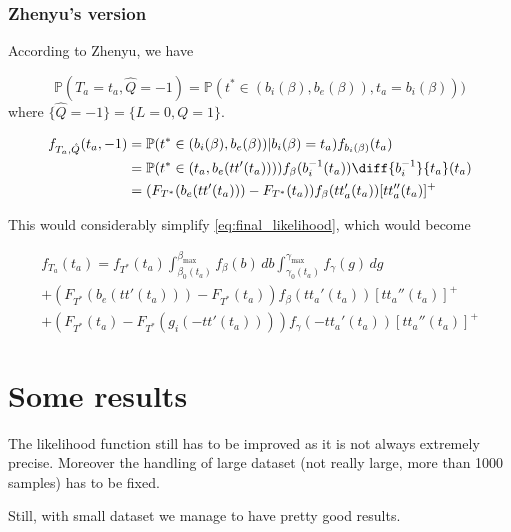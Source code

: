 \documentclass{article}
\begin{document}
\subsubsection{Zhenyu's version}

According to Zhenyu, we have

\begin{equation*}
  \mathbb{P}(T_a = t_a, \hat{Q} = -1) = \mathbb{P}(t^* \in (b_i(\beta), b_e(\beta)), t_a = b_i(\beta)))
\end{equation*}
where \(\{\hat{Q} = -1\} = \{L = 0, Q = 1\}\).

\begin{align*}
  f_{T_a, \hat{Q}}(t_a, -1) & = \mathbb{P}(t^* \in (b_i(\beta), b_e(\beta)) | b_i(\beta) = t_a)f_{b_i(\beta)}(t_a) \\
  & = \mathbb{P}(t^* \in (t_a, b_e(tt'(t_a)))) f_\beta(b_i^{-1}(t_a)) \diff{b_i^{-1}}{t_a}(t_a) \\
  & = (F_{T^*}(b_e(tt'(t_a))) - F_{T^*}(t_a))f_\beta(tt_a'(t_a))[tt_a''(t_a)]^+
\end{align*}

This would considerably simplify \eqref{eq:final_likelihood}, which would become

\begin{multline}
  \label{eq:final_zhenyu}
  f_{T_a}(t_a) = f_{T^*}(t_a)\int_{\beta_0(t_a)}^{\beta_\text{max}}f_\beta(b)\, db\int_{\gamma_0(t_a)}^{\gamma_\text{max}}f_\gamma(g)\, dg \\
  + (F_{T^*}(b_e(tt'(t_a))) - F_{T^*}(t_a))f_\beta(tt_a'(t_a))[tt_a''(t_a)]^+ \\
  + (F_{T^*}(t_a) - F_{T^*}(g_i(-tt'(t_a)))) f_\gamma(-tt_a'(t_a))[tt_a''(t_a)]^+
\end{multline}
\section{Some results}

The likelihood function still has to be improved as it is not always extremely precise. Moreover the handling of large dataset (not really large, more than 1000 samples) has to be fixed.

Still, with small dataset we manage to have pretty good results.
\end{document}
